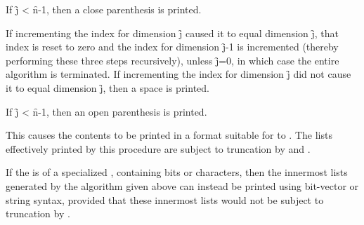 \beginlist
\itemitem{\bull}
If \f{j} < \f{n}-1, then a close parenthesis is printed.

\itemitem{\bull}
If incrementing the index for dimension \f{j} caused it to equal
dimension \f{j}, that index is reset to zero and the
index for dimension \f{j}-1 is incremented (thereby performing these three steps recursively),
unless \f{j}=0, in which case the entire algorithm is terminated.
If incrementing the index for dimension \f{j} did not cause it to
equal dimension \f{j}, then a space is printed.

\itemitem{\bull}
If \f{j} < \f{n}-1, then an open parenthesis is printed.
\endlist

This causes the contents to be printed in a format suitable for
 to .
The lists effectively printed by this procedure are subject to
truncation by  and .

If the  
is of a specialized , containing bits or characters,
then the innermost lists generated by the algorithm given above can instead
be printed using bit-vector or string syntax, provided that these innermost
lists would not be subject to truncation by .  
%
%
%                                                                               

